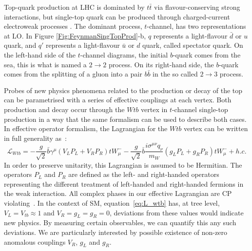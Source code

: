 


Top-quark production at LHC is dominated by $t\bar{t}$ via flavour-conserving strong interactions, but single-top quark can be produced through charged-current electroweak processes%
. The dominant process, $t$-channel, has two representations at LO. In Figure \ref{Fig:FeynmanSingTopProd}-b, $q$ represents a light-flavour $\bar{d}$ or $u$ quark, and $q'$ represents a light-flavour $\bar{u}$ or $d$ quark, called spectator quark. On the left-hand side of the $t$-channel diagrams, the initial $b$-quark comes from the sea, this is what is named a $2 \rightarrow 2$ process. On its right-hand side, the $b$-quark comes from the splitting of a gluon into a pair $b\bar{b}$ in the so called $2 \rightarrow 3$ process. %


Probes of new physics phenomena related to the production or decay of the top can be parametrised with a series of effective couplings at each vertex. Both production and decay occur through the $Wtb$ vertex in $t$-channel single-top production in a way that the same formalism can be used to describe both cases. In effective operator formalism, the Lagrangian for the $Wtb$ vertex can be written in full generality as~\cite{AguilarSaavedra:2010nx}:
\begin{equation} \label{eq:L_wtb}
\mathcal{L}_{Wtb}=-\frac{g}{\sqrt{2}}\bar{b}\gamma^\mu (V_L P_L + V_R P_R)tW^{-}_\mu -\frac{g}{\sqrt{2}}\bar{b}\frac{i \sigma^{\mu \nu}q_\nu}{m_W} (g_L P_L + g_R P_R)tW^{-}_\mu + h.c.
\end{equation}
In order to preserve unitarity, this Lagrangian is assumed to be Hermitian. The operators $P_L$ and $P_R$ are defined as the left- and right-handed
operators representing the different treatment of left-handed and right-handed fermions in the weak interaction. All complex phases in our effective Lagrangian are CP violating~\cite{Aguilar-Saavedra:2014eqa}. In the context of SM, equation~\eqref{eq:L_wtb} has, at tree level, $V_L = V_{tb} \approx 1$ and $V_R=g_L=g_R=0$, deviations from these values would indicate new physics. By measuring certain observables, we can quantify this any such deviations. We are particularly interested by possible existence of non-zero anomalous couplings $V_R$, $g_L$ and $g_R$. 


